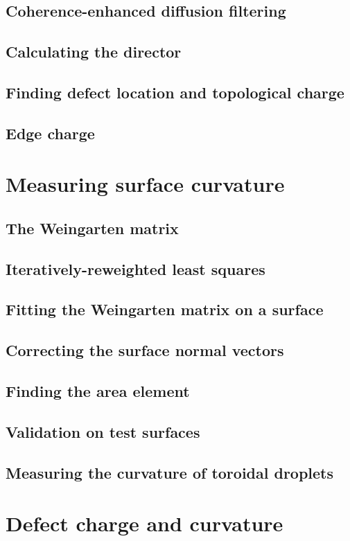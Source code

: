 \subsection{Coherence-enhanced diffusion filtering}
\subsection{Calculating the director}
\subsection{Finding defect location and topological charge}
\subsection{Edge charge}

\section{Measuring surface curvature}
\subsection{The Weingarten matrix}
\subsection{Iteratively-reweighted least squares}
\subsection{Fitting the Weingarten matrix on a surface}
\subsection{Correcting the surface normal vectors}
\subsection{Finding the area element}
\subsection{Validation on test surfaces}
\subsection{Measuring the curvature of toroidal droplets}

\section{Defect charge and curvature}
